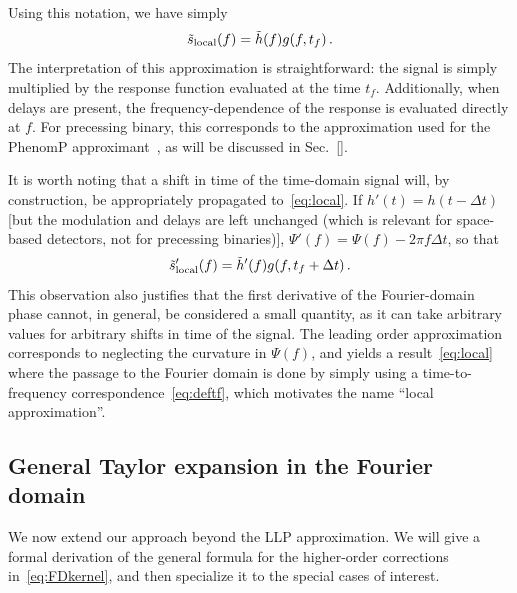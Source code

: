 \documentclass[aps,showpacs,%
prd,superscriptaddress,nofootinbib]{revtex4}
\newcommand{\be}{\begin{equation}}
\newcommand{\ee}{\end{equation}}
\newcommand{\tf}{t_{f}}
\begin{document}
Using this notation, we have simply
%
\be\label{eq:local}
	\tilde{s}_{\rm local}(f) = \tilde{h}(f) g(f, \tf) \,.
\ee
%
The interpretation of this approximation is straightforward: the signal is simply multiplied by the response function evaluated at the time $\tf$. Additionally, when delays are present, the frequency-dependence of the response is evaluated directly at $f$. For precessing binary, this corresponds to the approximation used for the PhenomP approximant~\cite{Hannam+13}, as will be discussed in Sec.~\ref{}.

It is worth noting that a shift in time of the time-domain signal will, by construction, be appropriately propagated to~\eqref{eq:local}. If $h'(t) = h(t -  \Delta t)$ [but the modulation and delays are left unchanged (which is relevant for space-based detectors, not for precessing binaries)], $\Psi'(f) = \Psi(f) - 2\pi f \Delta t$, so that
%
\be\label{eq:localshifted}
	\tilde{s}'_{\rm local}(f) = \tilde{h}'(f) g(f, \tf + \Delta t) \,. 
\ee
%
This observation also justifies that the first derivative of the Fourier-domain phase cannot, in general, be considered a small quantity, as it can take arbitrary values for arbitrary shifts in time of the signal. The leading order approximation corresponds to neglecting the curvature in $\Psi(f)$, and yields a result~\eqref{eq:local} where the passage to the Fourier domain is done by simply using a time-to-frequency correspondence~\eqref{eq:deftf}, which motivates the name ``local approximation''.


\subsection{General Taylor expansion in the Fourier domain}
\label{subsec:TaylorFD}

We now extend our approach beyond the LLP approximation. We will give a formal derivation of the  general formula for the higher-order corrections in~\eqref{eq:FDkernel}, and then specialize it to the special cases of interest.
\end{document}
